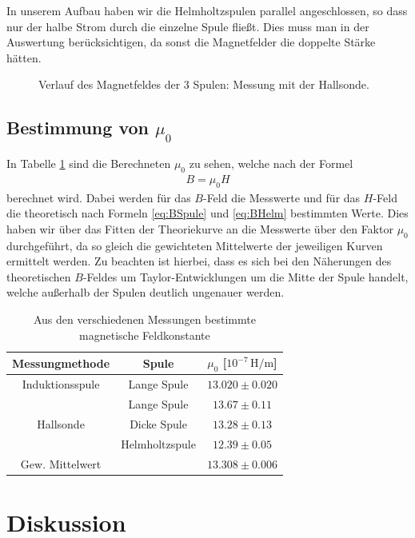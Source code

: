 \documentclass[12pt,a4paper,titlepage,headinclude,bibtotoc]{scrartcl}
\begin{document}
In unserem Aufbau haben wir die Helmholtzspulen parallel angeschlossen, so dass nur der halbe Strom durch die einzelne Spule fließt.
Dies muss man in der Auswertung berücksichtigen, da sonst die Magnetfelder die doppelte Stärke hätten.

\begin{figure}[!htb]
	\centering
	
	\caption{Verlauf des Magnetfeldes der 3 Spulen: Messung mit der Hallsonde.}
	\label{fig:Homogen}
\end{figure}

\subsection{Bestimmung von $\mu_0$}
In Tabelle \ref{tab:mu} sind die Berechneten $\mu_0$ zu sehen, welche nach der Formel
\begin{align*}
	B=\mu_0 H
\end{align*}
berechnet wird.
Dabei werden für das $B$-Feld die Messwerte und für das $H$-Feld die theoretisch nach Formeln \eqref{eq:BSpule} und \eqref{eq:BHelm} bestimmten Werte.
Dies haben wir über das Fitten der Theoriekurve an die Messwerte über den Faktor $\mu_0$ durchgeführt, da so gleich die gewichteten Mittelwerte der jeweiligen Kurven ermittelt werden.
Zu beachten ist hierbei, dass es sich bei den Näherungen des theoretischen $B$-Feldes um Taylor-Entwicklungen um die Mitte der Spule handelt, welche außerhalb der Spulen deutlich ungenauer werden.

\begin{table}[!htb]
	\centering
	\begin{tabular}{|c|c|c|}
	\hline
	Messungmethode & Spule & $\mu_0$ [$10^{-7}\,\si{\henry\per\meter}$]\\
	\hline
	\hline
	Induktionsspule & Lange Spule & $13.020 \pm 0.020$\\
	\hline
	          & Lange Spule & $13.67 \pm 0.11$ \\
	Hallsonde & Dicke Spule & $13.28 \pm 0.13$ \\
	          & Helmholtzspule & $12.39 \pm 0.05$ \\
	\hline\hline
	Gew. Mittelwert	& & $13.308\pm 0.006$ \\\hline
	\end{tabular}
	\caption{Aus den verschiedenen Messungen bestimmte magnetische Feldkonstante}
	\label{tab:mu}
\end{table}


\section{Diskussion}
\label{sec:diskussion}
\end{document}
